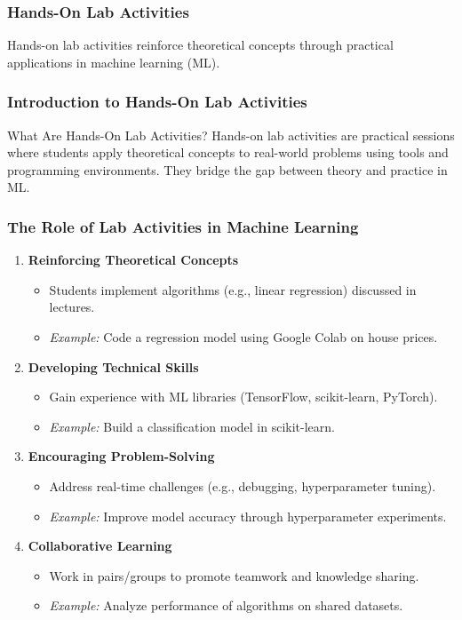 \documentclass[aspectratio=169]{beamer}
\begin{document}
\begin{frame}[fragile]
    \frametitle{Hands-On Lab Activities}
    Hands-on lab activities reinforce theoretical concepts through practical applications in machine learning (ML). 
\end{frame}

\begin{frame}[fragile]
    \frametitle{Introduction to Hands-On Lab Activities}
    \begin{block}{What Are Hands-On Lab Activities?}
        Hands-on lab activities are practical sessions where students apply theoretical concepts to real-world problems using tools and programming environments. They bridge the gap between theory and practice in ML.
    \end{block}
\end{frame}

\begin{frame}[fragile]
    \frametitle{The Role of Lab Activities in Machine Learning}
    \begin{enumerate}
        \item \textbf{Reinforcing Theoretical Concepts}
        \begin{itemize}
            \item Students implement algorithms (e.g., linear regression) discussed in lectures.
            \item \textit{Example:} Code a regression model using Google Colab on house prices.
        \end{itemize}

        \item \textbf{Developing Technical Skills}
        \begin{itemize}
            \item Gain experience with ML libraries (TensorFlow, scikit-learn, PyTorch).
            \item \textit{Example:} Build a classification model in scikit-learn.
        \end{itemize}

        \item \textbf{Encouraging Problem-Solving}
        \begin{itemize}
            \item Address real-time challenges (e.g., debugging, hyperparameter tuning).
            \item \textit{Example:} Improve model accuracy through hyperparameter experiments.
        \end{itemize}
        
        \item \textbf{Collaborative Learning}
        \begin{itemize}
            \item Work in pairs/groups to promote teamwork and knowledge sharing.
            \item \textit{Example:} Analyze performance of algorithms on shared datasets.
        \end{itemize}
    \end{enumerate}
\end{frame}
\end{document}
